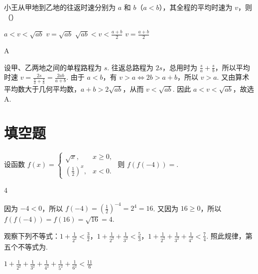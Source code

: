 \begin{problem}
小王从甲地到乙地的往返时速分别为 \(a\) 和 \(b\)（\(a < b\)），其全程的平均时速为 \(v\)，则（\quad）

\choices
    {\(a < v < \sqrt{ab}\)}
    {\(v = \sqrt{ab}\)}
    {\(\sqrt{ab} < v < \frac{a + b}{2}\)}
    {\(v = \frac{a + b}{2}\)}
\end{problem}

\begin{answer}
A
\end{answer}

\begin{solution}
设甲、乙两地之间的单程路程为 \(s\). 往返总路程为 \(2s\)，总用时为 \(\frac{s}{a}+\frac{s}{b}\)，所以平均时速 \(v=\frac{2s}{\frac{s}{a}+\frac{s}{b}}=\frac{2ab}{a+b}\). 由于 \(a<b\)，有 \(v>a\Longleftrightarrow2b>a+b\)，所以 \(v>a\). 又由算术平均数大于几何平均数，\(a+b>2\sqrt{ab}\)，从而 \(v<\sqrt{ab}\). 因此 \(a<v<\sqrt{ab}\)，故选 A.
\end{solution}

\section{填空题}

\begin{problem}
设函数 \(f(x) = \begin{cases}
\sqrt{x}, & x \geqslant 0,\\
\left(\frac{1}{2}\right)^x, & x < 0.
\end{cases}\) 则 \(f\left(f(-4)\right) = \)\fillinblank{}.
\end{problem}

\begin{answer}
4
\end{answer}

\begin{solution}
因为 \(-4<0\)，所以 \(f(-4)=\left(\frac{1}{2}\right)^{-4}=2^4=16\). 又因为 \(16\geqslant0\)，所以 \(f\left(f(-4)\right)=f(16)=\sqrt{16}=4\).
\end{solution}

\begin{problem}
观察下列不等式：\(1 + \frac{1}{2^2} < \frac{3}{2}\)，\(1 + \frac{1}{2^2} + \frac{1}{3^2} < \frac{5}{3}\)，\(1 + \frac{1}{2^2} + \frac{1}{3^2} + \frac{1}{4^2} < \frac{7}{4}\). 照此规律，第五个不等式为\fillinblank{}.
\end{problem}

\begin{answer}
\(1 + \frac{1}{2^2} + \frac{1}{3^2} + \frac{1}{4^2} + \frac{1}{5^2} + \frac{1}{6^2} < \frac{11}{6}\)
\end{answer}

